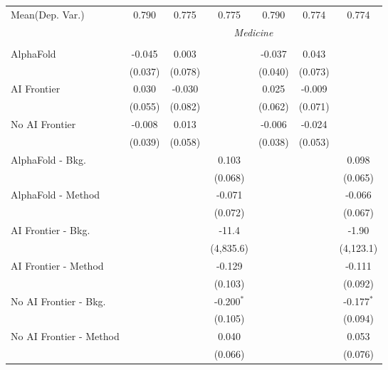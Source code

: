 \begin{tabular}{lcccccc}
Mean(Dep. Var.) & 0.790 & 0.775 & 0.775 & 0.790 & 0.774 & 0.774 \\
 & \multicolumn{6}{c}{\textit{Medicine}} \\ \\
   AlphaFold               & -0.045  & 0.003   &              & -0.037  & 0.043   &   \\   
                           & (0.037) & (0.078) &              & (0.040) & (0.073) &   \\   
   AI Frontier             & 0.030   & -0.030  &              & 0.025   & -0.009  &   \\   
                           & (0.055) & (0.082) &              & (0.062) & (0.071) &   \\   
   No AI Frontier          & -0.008  & 0.013   &              & -0.006  & -0.024  &   \\   
                           & (0.039) & (0.058) &              & (0.038) & (0.053) &   \\   
   AlphaFold - Bkg.        &         &         & 0.103        &         &         & 0.098\\   
                           &         &         & (0.068)      &         &         & (0.065)\\   
   AlphaFold - Method      &         &         & -0.071       &         &         & -0.066\\   
                           &         &         & (0.072)      &         &         & (0.067)\\   
   AI Frontier - Bkg.      &         &         & -11.4        &         &         & -1.90\\   
                           &         &         & (4,835.6)    &         &         & (4,123.1)\\   
   AI Frontier - Method    &         &         & -0.129       &         &         & -0.111\\   
                           &         &         & (0.103)      &         &         & (0.092)\\   
   No AI Frontier - Bkg.   &         &         & -0.200$^{*}$ &         &         & -0.177$^{*}$\\   
                           &         &         & (0.105)      &         &         & (0.094)\\   
   No AI Frontier - Method &         &         & 0.040        &         &         & 0.053\\   
                           &         &         & (0.066)      &         &         & (0.076)\\   

\end{tabular}
